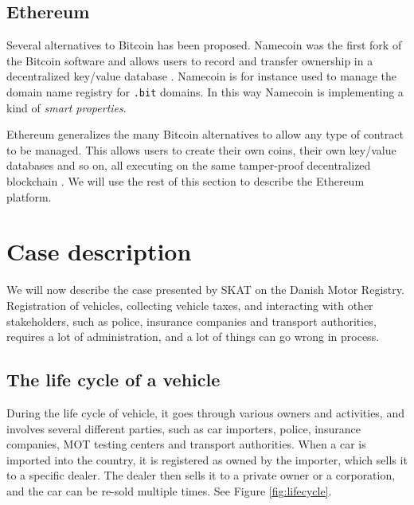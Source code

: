 \documentclass[oneside,a4paper,10pts,article]{memoir}
\begin{document}


\section{Ethereum}
Several alternatives to Bitcoin has been proposed. Namecoin was the
first fork of the Bitcoin software and allows users to record and
transfer ownership in a decentralized key/value database
\cite{namecoin}. Namecoin is for instance used to manage the domain
name registry for \texttt{.bit} domains. In this way Namecoin is
implementing a kind of \textit{smart properties}.

Ethereum generalizes the many Bitcoin alternatives to allow any type
of contract to be managed. This allows users to create their own
coins, their own key/value databases and so on, all executing on the
same tamper-proof decentralized blockchain \cite{buterin2013ethereum,
  wood2014ethereum}. We will use the rest of this section to describe
the Ethereum platform.



\chapter{Case description}
\label{sec:case}
We will now describe the case presented by SKAT on the Danish Motor
Registry. Registration of vehicles, collecting vehicle taxes, and
interacting with other stakeholders, such as police, insurance
companies and transport authorities, requires a lot of administration,
and a lot of things can go wrong in process.

\section{The life cycle of a vehicle}
During the life cycle of vehicle, it goes through various owners and
activities, and involves several different parties, such as car
importers, police, insurance companies, MOT testing centers and
transport authorities. When a car is imported into the country, it is
registered as owned by the importer, which sells it to a specific
dealer. The dealer then sells it to a private owner or a corporation,
and the car can be re-sold multiple times. See Figure \ref{fig:lifecycle}.
\end{document}
